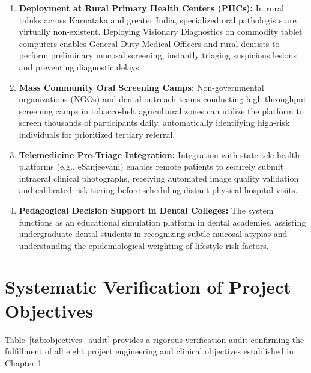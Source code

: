 \documentclass[12pt,a4paper,oneside]{report}
\begin{document}
\begin{enumerate}[label=\arabic*.]
    \item \textbf{Deployment at Rural Primary Health Centers (PHCs):} In rural taluks across Karnataka and greater India, specialized oral pathologists are virtually non-existent. Deploying Visionary Diagnostics on commodity tablet computers enables General Duty Medical Officers and rural dentists to perform preliminary mucosal screening, instantly triaging suspicious lesions and preventing diagnostic delays.
    
    \item \textbf{Mass Community Oral Screening Camps:} Non-governmental organizations (NGOs) and dental outreach teams conducting high-throughput screening camps in tobacco-belt agricultural zones can utilize the platform to screen thousands of participants daily, automatically identifying high-risk individuals for prioritized tertiary referral.
    
    \item \textbf{Telemedicine Pre-Triage Integration:} Integration with state tele-health platforms (e.g., eSanjeevani) enables remote patients to securely submit intraoral clinical photographs, receiving automated image quality validation and calibrated risk tiering before scheduling distant physical hospital visits.
    
    \item \textbf{Pedagogical Decision Support in Dental Colleges:} The system functions as an educational simulation platform in dental academies, assisting undergraduate dental students in recognizing subtle mucosal atypias and understanding the epidemiological weighting of lifestyle risk factors.
\end{enumerate}

\section{Systematic Verification of Project Objectives}
\label{sec:objectives_verification}

Table~\ref{tab:objectives_audit} provides a rigorous verification audit confirming the fulfillment of all eight project engineering and clinical objectives established in Chapter 1.
\end{document}
